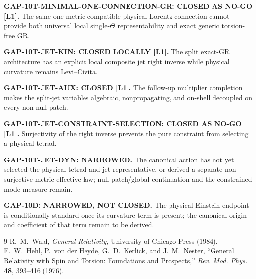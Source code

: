 \documentclass[11pt,a4paper]{article}
\begin{document}
\begin{tcolorbox}[colback=green!6!white,colframe=green!55!black,
 title=Exact status]
\textbf{GAP-10T-MINIMAL-ONE-CONNECTION-GR: CLOSED AS NO-GO [L1].}
The same one metric-compatible physical Lorentz connection cannot provide both
universal local single-$\Theta$ representability and exact generic torsion-free
GR.

\medskip
\textbf{GAP-10T-JET-KIN: CLOSED LOCALLY [L1].}
The split exact-GR architecture has an explicit local composite jet right
inverse while physical curvature remains Levi--Civita.

\medskip
\textbf{GAP-10T-JET-AUX: CLOSED [L1].}
The follow-up multiplier completion makes the split-jet variables algebraic,
nonpropagating, and on-shell decoupled on every non-null patch.

\medskip
\textbf{GAP-10T-JET-CONSTRAINT-SELECTION: CLOSED AS NO-GO [L1].}
Surjectivity of the right inverse prevents the pure constraint from selecting a
physical tetrad.

\medskip
\textbf{GAP-10T-JET-DYN: NARROWED.}
The canonical action has not yet selected the physical tetrad and jet
representative, or derived a separate non-surjective metric effective law;
null-patch/global continuation and the constrained mode measure remain.

\medskip
\textbf{GAP-10D: NARROWED, NOT CLOSED.}
The physical Einstein endpoint is conditionally standard once its curvature
term is present; the canonical origin and coefficient of that term remain to
be derived.
\end{tcolorbox}

\begin{thebibliography}{9}
 R.~M.~Wald, \emph{General Relativity}, University of Chicago Press (1984).
 F.~W.~Hehl, P.~von der Heyde, G.~D.~Kerlick, and J.~M.~Nester,
``General Relativity with Spin and Torsion: Foundations and Prospects,''
\emph{Rev. Mod. Phys.} \textbf{48}, 393--416 (1976).
\end{thebibliography}
\end{document}
